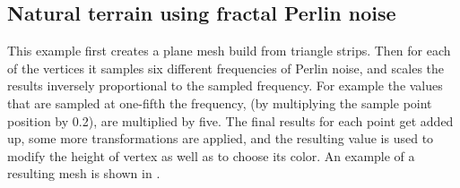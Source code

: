 \subsection{Natural terrain using fractal Perlin noise}

This example first creates a plane mesh build from triangle strips.
Then for each of the vertices it samples six different frequencies of Perlin noise,
and scales the results inversely proportional to the sampled frequency.
For example the values that are sampled at one-fifth the frequency,
(by multiplying the sample point position by 0.2),
are multiplied by five.
The final results for each point get added up,
some more transformations are applied,
and the resulting value is used to modify the height of vertex as well as to choose its color.
An example of a resulting mesh is shown in .


